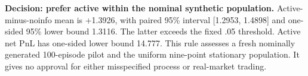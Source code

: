 \textbf{Decision: prefer active within the nominal synthetic population.} Active-minus-noinfo mean is +1.3926, with paired 95\% interval [1.2953, 1.4898] and one-sided 95\% lower bound 1.3116. The latter exceeds the fixed .05 threshold. Active net PnL has one-sided lower bound 14.777. This rule assesses a fresh nominally generated 100-episode pilot and the uniform nine-point stationary population. It gives no approval for either misspecified process or real-market trading.
